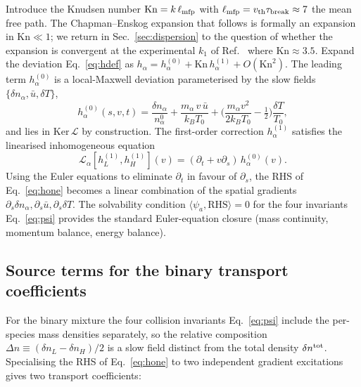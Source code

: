 \documentclass[aps,pre,twocolumn,superscriptaddress,longbibliography,floatfix]{revtex4-2}
\begin{document}
Introduce the Knudsen number $\mathrm{Kn}=k\,\ell_{\rm mfp}$
with $\ell_{\rm mfp}=v_{\rm th}\tau_{\rm break}\approx 7$
the mean free path. The Chapman--Enskog expansion that
follows is formally an expansion in $\mathrm{Kn}\ll 1$; we
return in Sec.~\ref{sec:dispersion} to the question of
whether the expansion is convergent at the experimental
$k_1$ of Ref.~\cite{PaperII} where $\mathrm{Kn}\approx 3.5$.
Expand the deviation Eq.~\eqref{eq:hdef} as
$h_\alpha = h_\alpha^{(0)}+\mathrm{Kn}\,h_\alpha^{(1)}
+O(\mathrm{Kn}^2)$.
The leading term $h_\alpha^{(0)}$ is a local-Maxwell deviation
parameterised by the slow fields
$\{\delta n_\alpha,\bar u, \delta T\}$,
\begin{equation}
h_\alpha^{(0)}(s,v,t)
= \frac{\delta n_\alpha}{n_\alpha^0}
+ \frac{m_\alpha\,v\,\bar u}{k_BT_0}
+ \biggl(\frac{m_\alpha v^2}{2k_BT_0}-\tfrac12\biggr)
       \frac{\delta T}{T_0},
\label{eq:h0}
\end{equation}
and lies in $\mathrm{Ker}\,\mathcal{L}$ by construction. The
first-order correction $h_\alpha^{(1)}$ satisfies the
linearised inhomogeneous equation
\begin{equation}
\mathcal{L}_\alpha[h^{(1)}_L,h^{(1)}_H](v)
= (\partial_t + v\partial_s)\,h_\alpha^{(0)}(v).
\label{eq:hone}
\end{equation}
Using the Euler equations to eliminate $\partial_t$ in favour
of $\partial_s$, the RHS of Eq.~\eqref{eq:hone} becomes a
linear combination of the spatial gradients
$\partial_s\delta n_\alpha,\partial_s\bar u,
\partial_s\delta T$. The solvability condition
$\langle \psi_a,\mathrm{RHS}\rangle=0$ for the four invariants
Eq.~\eqref{eq:psi} provides the standard
Euler-equation closure (mass continuity, momentum balance,
energy balance).

\subsection{Source terms for the binary transport coefficients}

For the binary mixture the four collision invariants
Eq.~\eqref{eq:psi} include the per-species mass densities
separately, so the relative composition
$\Delta n\equiv (\delta n_L-\delta n_H)/2$ is a slow field
distinct from the total density $\delta n^{\rm tot}$.
Specialising the RHS of Eq.~\eqref{eq:hone} to two
independent gradient excitations gives two transport
coefficients:
\end{document}
